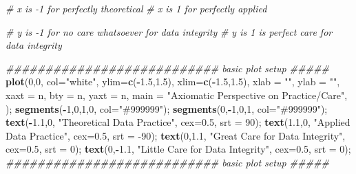 \documentclass[
]{article}
\newenvironment{Shaded}{\begin{snugshade}}{\end{snugshade}}
\newcommand{\CommentTok}[1]{\textcolor[rgb]{0.56,0.35,0.01}{\textit{#1}}}
\newcommand{\DataTypeTok}[1]{\textcolor[rgb]{0.13,0.29,0.53}{#1}}
\newcommand{\DecValTok}[1]{\textcolor[rgb]{0.00,0.00,0.81}{#1}}
\newcommand{\FloatTok}[1]{\textcolor[rgb]{0.00,0.00,0.81}{#1}}
\newcommand{\KeywordTok}[1]{\textcolor[rgb]{0.13,0.29,0.53}{\textbf{#1}}}
\newcommand{\NormalTok}[1]{#1}
\newcommand{\OperatorTok}[1]{\textcolor[rgb]{0.81,0.36,0.00}{\textbf{#1}}}
\newcommand{\StringTok}[1]{\textcolor[rgb]{0.31,0.60,0.02}{#1}}
\begin{document}
\begin{Shaded}
\begin{Highlighting}[]
\CommentTok{\# x is {-}1 for perfectly theoretical}
\CommentTok{\# x is 1 for perfectly applied}

\CommentTok{\# y is {-}1 for no care whatsoever for data integrity}
\CommentTok{\# y is 1 is perfect care for data integrity}

\CommentTok{\#\#\#\#\#\#\#\#\#\#\#\#\#\#\#\#\#\#\#\#\#\#\#\#\#\#\# basic plot setup \#\#\#\#\#}
\KeywordTok{plot}\NormalTok{(}\DecValTok{0}\NormalTok{,}\DecValTok{0}\NormalTok{, }\DataTypeTok{col=}\StringTok{"white"}\NormalTok{, }
  \DataTypeTok{ylim=}\KeywordTok{c}\NormalTok{(}\OperatorTok{{-}}\FloatTok{1.5}\NormalTok{,}\FloatTok{1.5}\NormalTok{), }\DataTypeTok{xlim=}\KeywordTok{c}\NormalTok{(}\OperatorTok{{-}}\FloatTok{1.5}\NormalTok{,}\FloatTok{1.5}\NormalTok{),}
  \DataTypeTok{xlab =} \StringTok{""}\NormalTok{,}
  \DataTypeTok{ylab =} \StringTok{""}\NormalTok{,}
  \DataTypeTok{xaxt =} \StringTok{\textquotesingle{}n\textquotesingle{}}\NormalTok{, }\DataTypeTok{bty =} \StringTok{\textquotesingle{}n\textquotesingle{}}\NormalTok{, }\DataTypeTok{yaxt =} \StringTok{\textquotesingle{}n\textquotesingle{}}\NormalTok{,}
  \DataTypeTok{main =} \StringTok{"Axiomatic Perspective on Practice/Care"}\NormalTok{,}
\NormalTok{  );}
\KeywordTok{segments}\NormalTok{(}\OperatorTok{{-}}\DecValTok{1}\NormalTok{,}\DecValTok{0}\NormalTok{,}\DecValTok{1}\NormalTok{,}\DecValTok{0}\NormalTok{, }\DataTypeTok{col=}\StringTok{"\#999999"}\NormalTok{);}
\KeywordTok{segments}\NormalTok{(}\DecValTok{0}\NormalTok{,}\OperatorTok{{-}}\DecValTok{1}\NormalTok{,}\DecValTok{0}\NormalTok{,}\DecValTok{1}\NormalTok{, }\DataTypeTok{col=}\StringTok{"\#999999"}\NormalTok{);}
\KeywordTok{text}\NormalTok{(}\OperatorTok{{-}}\FloatTok{1.1}\NormalTok{,}\DecValTok{0}\NormalTok{, }\StringTok{"Theoretical Data Practice"}\NormalTok{, }\DataTypeTok{cex=}\FloatTok{0.5}\NormalTok{, }\DataTypeTok{srt =} \DecValTok{90}\NormalTok{);}
\KeywordTok{text}\NormalTok{(}\FloatTok{1.1}\NormalTok{,}\DecValTok{0}\NormalTok{, }\StringTok{"Applied Data Practice"}\NormalTok{, }\DataTypeTok{cex=}\FloatTok{0.5}\NormalTok{, }\DataTypeTok{srt =} \DecValTok{{-}90}\NormalTok{);}
\KeywordTok{text}\NormalTok{(}\DecValTok{0}\NormalTok{,}\FloatTok{1.1}\NormalTok{, }\StringTok{"Great Care for Data Integrity"}\NormalTok{, }\DataTypeTok{cex=}\FloatTok{0.5}\NormalTok{, }\DataTypeTok{srt =} \DecValTok{0}\NormalTok{);}
\KeywordTok{text}\NormalTok{(}\DecValTok{0}\NormalTok{,}\OperatorTok{{-}}\FloatTok{1.1}\NormalTok{, }\StringTok{"Little Care for Data Integrity"}\NormalTok{, }\DataTypeTok{cex=}\FloatTok{0.5}\NormalTok{, }\DataTypeTok{srt =} \DecValTok{0}\NormalTok{);}
\CommentTok{\#\#\#\#\#\#\#\#\#\#\#\#\#\#\#\#\#\#\#\#\#\#\#\#\#\#\# basic plot setup \#\#\#\#\#}



\end{Highlighting}
\end{Shaded}
\end{document}
